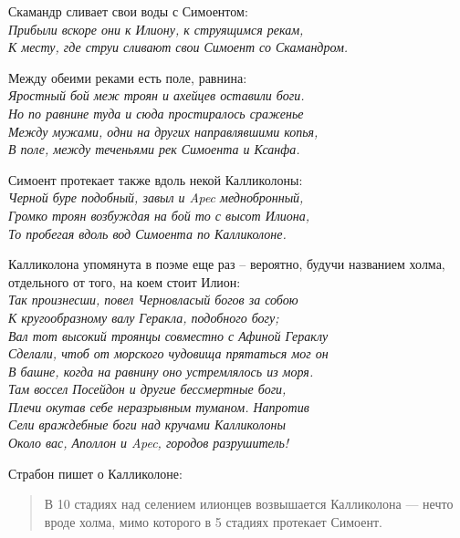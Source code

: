 Скамандр сливает свои воды с Симоентом:\\

\noindent
\textit{Прибыли вскоре они к Илиону, к струящимся рекам,\\
К месту, где струи сливают свои Симоент со Скамандром.\\}

Между обеими реками есть поле, равнина:\\

\noindent
\textit{Яростный бой меж троян и ахейцев оставили боги.\\
Но по равнине туда и сюда простиралось сраженье\\
Между мужами, одни на других направлявшими копья,\\
В поле, между теченьями рек Симоента и Ксанфа.\\}

Симоент протекает также вдоль некой Калликолоны:\\

\noindent
\textit{Черной буре подобный, завыл и Apec меднобронный,\\
Громко троян возбуждая на бой то с высот Илиона,\\
То пробегая вдоль вод Симоента по Калликолоне.\\}

Калликолона упомянута в поэме еще раз – вероятно, будучи названием холма, отдельного от того, на коем стоит Илион:\\

\noindent
\textit{Так произнесши, повел Черновласый богов за собою\\
К кругообразному валу Геракла, подобного богу;\\
Вал тот высокий троянцы совместно с Афиной Гераклу\\
Сделали, чтоб от морского чудовища прятаться мог он\\
В башне, когда на равнину оно устремлялось из моря.\\
Там воссел Посейдон и другие бессмертные боги,\\
Плечи окутав себе неразрывным туманом. Напротив\\
Сели враждебные боги над кручами Калликолоны\\
Около вас, Аполлон и Apec, городов разрушитель!\\}

Страбон пишет о Калликолоне:

\begin{quotation} 
В 10 стадиях над селением илионцев возвышается Калликолона — нечто вроде холма, мимо которого в 5 стадиях протекает Симоент.
\end{quotation}

